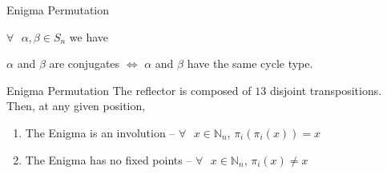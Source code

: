 \documentclass[hyphens,aspectratio=169]{beamer}
\begin{document}


\begin{frame}{Enigma Permutation}
	\begin{theorem}
		$\forall\text{ }\alpha, \beta \in S_n$ we have
		\begin{center}
			$\alpha$ and $\beta$ are conjugates $\iff$ $\alpha$ and $\beta$
			have the same cycle type.
		\end{center}
	\end{theorem}

\end{frame}

\begin{frame}{Enigma Permutation}
	The reflector is composed of $13$ disjoint transpositions. Then, at any given position,
	\vspace{1em}
	\begin{enumerate}

		\item The Enigma is an involution -- $\forall \text{ }x\in\mathbb{N}_n$, $\pi_i(\pi_i(x)) = x$
		      \vspace{1em}
		\item The Enigma has no fixed points -- $\forall\text{ }x\in\mathbb{N}_n$, $\pi_i(x) \ne x$
	\end{enumerate}
\end{frame}
\end{document}
